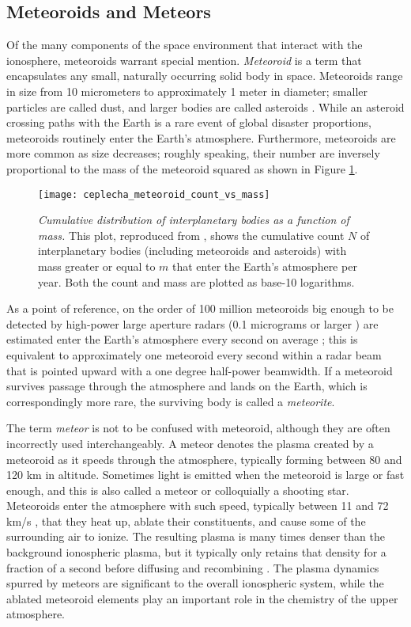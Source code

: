\subsection{Meteoroids and Meteors}
\label{intro_meteoroids}
Of the many components of the space environment that interact with the ionosphere, meteoroids warrant special mention. \emph{Meteoroid} is a term that encapsulates any small, naturally occurring solid body in space. Meteoroids range in size from 10 micrometers to approximately 1 meter in diameter; smaller particles are called dust, and larger bodies are called asteroids \autocite{RG10}. While an asteroid crossing paths with the Earth is a rare event of global disaster proportions, meteoroids routinely enter the Earth's atmosphere. Furthermore, meteoroids are more common as size decreases; roughly speaking, their number are inversely proportional to the mass of the meteoroid squared as shown in Figure \ref{fig:meteoroid_mass_distribution}.
\begin{figure}[tpb]
 \centering
 \texttt{[image: ceplecha\_meteoroid\_count\_vs\_mass]}
 \caption[Cumulative distribution of interplanetary bodies as a function of mass]{\emph{Cumulative distribution of interplanetary bodies as a function of mass.} This plot, reproduced from \textcite{CBE+98}, shows the cumulative count $N$ of interplanetary bodies (including meteoroids and asteroids) with mass greater or equal to $m$ that enter the Earth's atmosphere per year. Both the count and mass are plotted as base-10 logarithms.}
 \label{fig:meteoroid_mass_distribution}
\end{figure}%
As a point of reference, on the order of 100 million meteoroids big enough to be detected by high-power large aperture radars (0.1 micrograms or larger \autocite{CBC+07}) are estimated enter the Earth's atmosphere every second on average \autocite{CBE+98}; this is equivalent to approximately one meteoroid every second within a radar beam that is pointed upward with a one degree half-power beamwidth. If a meteoroid survives passage through the atmosphere and lands on the Earth, which is correspondingly more rare, the surviving body is called a \emph{meteorite}.

The term \emph{meteor} is not to be confused with meteoroid, although they are often incorrectly used interchangeably. A meteor denotes the plasma created by a meteoroid as it speeds through the atmosphere, typically forming between 80 and 120 km in altitude. Sometimes light is emitted when the meteoroid is large or fast enough, and this is also called a meteor or colloquially a shooting star. Meteoroids enter the atmosphere with such speed, typically between 11 and 72 km/s \autocite{CBE+98}, that they heat up, ablate their constituents, and cause some of the surrounding air to ionize. The resulting plasma is many times denser than the background ionospheric plasma, but it typically only retains that density for a fraction of a second before diffusing and recombining \autocite{Jon95, DWB+08}. The plasma dynamics spurred by meteors are significant to the overall ionospheric system, while the ablated meteoroid elements play an important role in the chemistry of the upper atmosphere.


